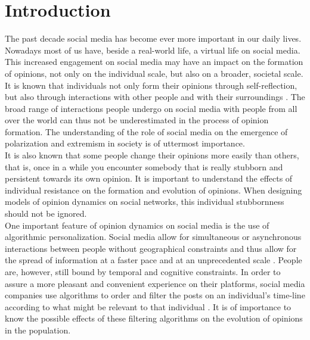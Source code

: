 \documentclass[11 pt , letterpaper , twoside , openright]{book}
\begin{document}
\mainmatter



\pagestyle{fancy}
\fancyhf{}
\lhead{\textcolor{NavyBlue}{\chaptername} \ \textcolor{NavyBlue}{\thechapter}}
\rhead{\rightmark}
\cfoot{\thepage}

\chapter{Introduction}


The past decade social media has become ever more important in our daily lives. Nowadays most of us have, beside a real-world life, a virtual life on social media. This increased engagement on social media may have an impact on the formation of opinions, not only on the individual scale, but also on a broader, societal scale. \\
\newline
It is known that individuals not only form their opinions through self-reflection, but also through interactions with other people and with their surroundings \cite{Perra2019}. The broad range of interactions people undergo on social media with people from all over the world can thus not be underestimated in the process of opinion formation. The understanding of the role of social media on the emergence of polarization and extremism in society is of uttermost importance.\\
\newline
It is also known that some people change their opinions more easily than others, that is, once in a while you encounter somebody that is really stubborn and persistent towards its own opinion. It is important to understand the effects of individual resistance on the formation and evolution of opinions. When designing models of opinion dynamics on social networks, this individual stubbornness should not be ignored.\\
\newline
One important feature of opinion dynamics on social media is the use of algorithmic personalization. Social media allow for simultaneous or asynchronous interactions between people without geographical constraints and thus allow for the spread of information at a faster pace and at an unprecedented scale \cite{Perra2019}. People are, however, still bound by temporal and cognitive constraints. In order to assure a more pleasant and convenient experience on their platforms, social media companies use algorithms to order and filter the posts on an individual's time-line according to what might be relevant to that individual \cite{Perra2019}. It is of importance to know the possible effects of these filtering algorithms on the evolution of opinions in the population.\\  
\end{document}
